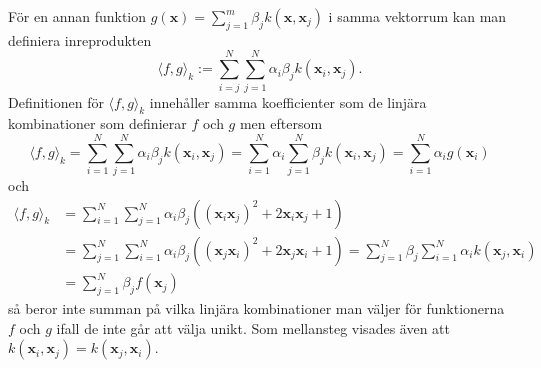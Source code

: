 \documentclass[a4paper, 12pt]{report}
\theoremstyle{definition}
\theoremstyle{remark}
\newcommand{\bfx}{\mathbf{x}}
\begin{document}
För en annan funktion $g\left(\bfx\right)=\sum_{j=1}^{m}\beta_jk\left(\bfx, \bfx_j\right)$ i samma vektorrum kan man definiera inreprodukten
\begin{equation}\label{eq:polykärnaprodukt}
	\langle f , g\rangle_k := \sum_{i=j}^{N}\sum_{j=1}^{N} \alpha_i \beta_j k\left(\bfx_i, \bfx_j\right).
\end{equation}
Definitionen för $\langle f, g \rangle_k$ innehåller samma koefficienter som de linjära kombinationer som definierar $f$ och $g$ men eftersom
\begin{equation}\label{eq:expansion1}
	\langle f, g \rangle_k = \sum_{i=1}^{N} \sum_{j=1}^{N} \alpha_i \beta_j k\left(\bfx_i, \bfx_j\right) = \sum_{i=1}^{N} \alpha_i \sum_{j=1}^{N}\beta_j k\left(\bfx_i, \bfx_j\right)=\sum_{i=1}^{N} \alpha_i g\left(\bfx_i\right)
\end{equation}
och
\begin{equation}\label{eq:expansion2}
\begin{aligned}
	\langle f, g \rangle_k &= \sum_{i=1}^{N} \sum_{j=1}^{N} \alpha_i \beta_j \left(\left(\bfx_i\bfx_j\right)^2 + 2\bfx_i\bfx_j+1\right)\\
	&= \sum_{j=1}^{N} \sum_{i=1}^{N} \alpha_i \beta_j \left(\left(\bfx_j\bfx_i\right)^2 + 2\bfx_j\bfx_i+1\right) = \sum_{j=1}^{N} \beta_j \sum_{i=1}^{N}\alpha_i k\left(\bfx_j, \bfx_i\right) \\
	&= \sum_{j=1}^{N} \beta_j f\left(\bfx_j\right)
\end{aligned}
\end{equation}
så beror inte summan på vilka linjära kombinationer man väljer för funktionerna $f$ och $g$ ifall de inte går att välja unikt. Som mellansteg visades även att $k\left(\bfx_i,\bfx_j\right)=k\left(\bfx_j, \bfx_i\right)$.
\end{document}
